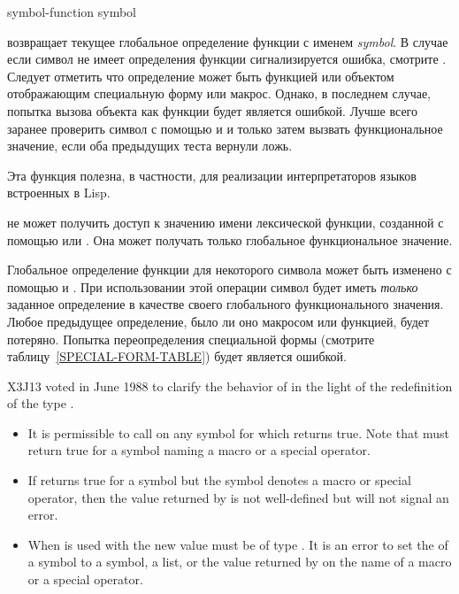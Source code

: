 \begin{defun}[Функция]
symbol-function symbol

 возвращает текущее глобальное определение функции с именем
\emph{symbol}. В случае если символ не имеет определения функции сигнализируется
ошибка, смотрите . Следует отметить что определение может быть
функцией или объектом отображающим специальную форму или макрос.
Однако, в последнем случае, попытка вызова объекта как функции будет является
ошибкой.
Лучше всего заранее проверить символ с помощью  и
 и только затем вызвать функциональное значение, если оба
предыдущих теста вернули ложь.

Эта функция полезна, в частности, для реализации интерпретаторов языков
встроенных в Lisp.

 не может получить доступ к значению имени лексической
функции, созданной с помощью  или . Она может получать
только глобальное функциональное значение.

Глобальное определение функции для некоторого символа может быть изменено с
помощью  и .
При использовании этой операции символ будет иметь \emph{только} заданное определение в качестве своего
глобального функционального значения. Любое предыдущее определение, было ли оно
макросом или функцией, будет потеряно.
Попытка переопределения специальной формы (смотрите
таблицу~\ref{SPECIAL-FORM-TABLE}) будет является ошибкой.

\begin{newer}
X3J13 voted in June 1988  to clarify the behavior
of  in the light of the redefinition of the type .
\begin{itemize}
\item It is permissible to call 
    on any symbol for which  returns true.
 Note that  must return true for a symbol naming a macro or
    a special operator.

\item If  returns true for a symbol
        but the symbol denotes a macro or special operator,
        then the value returned by  is not well-defined
        but  will not signal an error. 

\item When  is used with 
 the new value must be of type .
	It is an error to set the  of a symbol to a
	symbol, a list, or the value returned by  on
	the name of a macro or a special operator.
\end{itemize}
\end{newer}
\end{defun}

